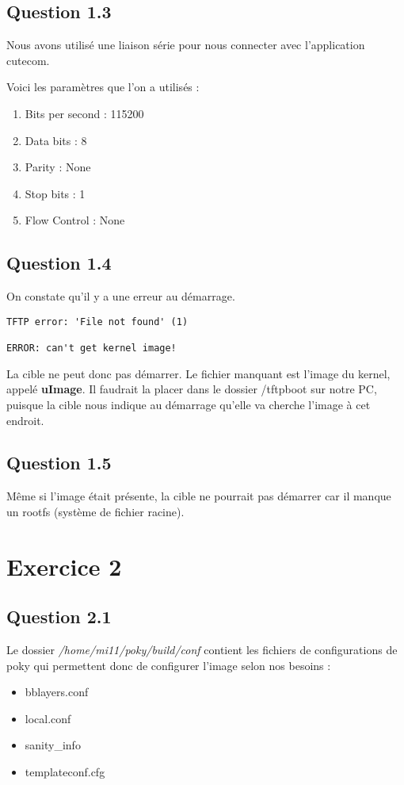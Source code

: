 \documentclass[a4paper,12pt]{report}
\begin{document}
\subsection{Question 1.3}
Nous avons utilisé une liaison série pour nous connecter avec l'application cutecom.

Voici les paramètres que l'on a utilisés :
\begin{enumerate}
\item Bits per second : 115200
\item Data bits : 8
\item Parity : None
\item Stop bits : 1
\item Flow Control : None
\end{enumerate}

\subsection{Question 1.4}
On constate qu'il y a une erreur au démarrage.

\begin{lstlisting}
TFTP error: 'File not found' (1)

ERROR: can't get kernel image!
\end{lstlisting}

La cible ne peut donc pas démarrer. Le fichier manquant est l'image du kernel, appelé \textbf{uImage}.
Il faudrait la placer dans le dossier /tftpboot sur notre PC, puisque la cible nous indique au démarrage qu'elle va cherche l'image à cet endroit.

\subsection{Question 1.5}
Même si l'image était présente, la cible ne pourrait pas démarrer car il manque un rootfs (système de fichier racine).

\section{Exercice 2}
\subsection{Question 2.1}
Le dossier \textit{/home/mi11/poky/build/conf} contient les fichiers de configurations de poky qui permettent donc de configurer l'image selon nos besoins :
\begin{itemize}
\item bblayers.conf
\item local.conf
\item sanity\_info
\item templateconf.cfg
\end{itemize}
\end{document}
